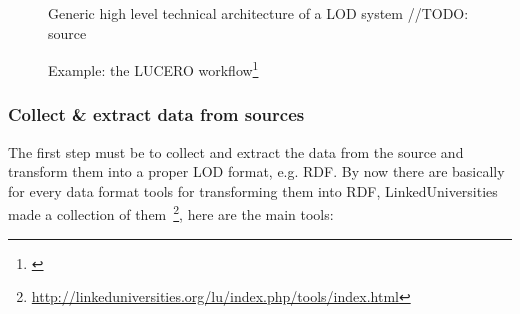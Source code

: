 {\begin{figure}[htbp]
\centering
{}
\caption[Generic high level technical architecture of a LOD system]{Generic high level technical architecture of a LOD system //TODO: source}
\label{Fi:tec_architecture}
\end{figure}
\begin{figure}[htbp]
\centering
{}
\caption[Example: the LUCERO workflow]{Example: the LUCERO workflow\footnote{\citet{url:lucero-tabloid}}}
\label{Fi:lucero_architecture}
\end{figure}

\subsubsection{Collect \& extract data from sources}\label{subsubsec:sources}
The first step must be to collect and extract the data from the source and transform them into a proper LOD format, e.g. RDF. By now there are basically for every data format tools for transforming them into RDF, LinkedUniversities made a collection of them~\footnote{\url{http://linkeduniversities.org/lu/index.php/tools/index.html}}, here are the main tools:

}
